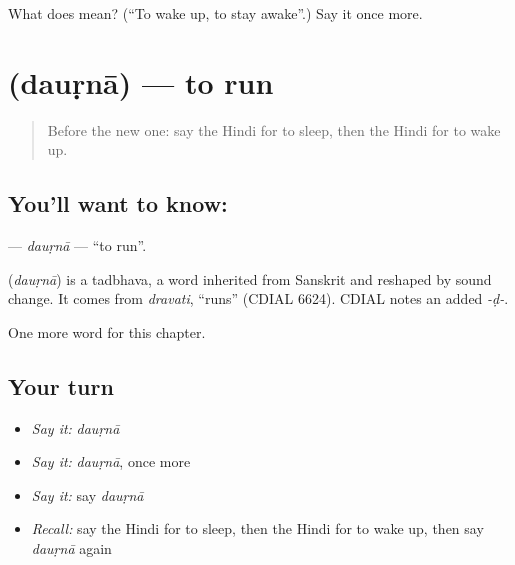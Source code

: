 \begin{tcolorbox}[breakable,colback=teal!4,colframe=teal!35!black,title={Before you move on}]
What does  mean? (\textquotedblleft{}To wake up, to stay awake\textquotedblright{}.) Say it once more.
\end{tcolorbox}
\section[\texorpdfstring{\hi{दौड़ना} (dauṛnā)}{दौड़ना (dauṛnā)}]{ (dauṛnā) — to run}

\label{lesson:HI-C159-daurna}



\begin{quote}
Before the new one: say the Hindi for to sleep, then the Hindi for to wake up.
\end{quote}

\subsection*{You'll want to know: }
\textbf{} — \emph{dauṛnā} — \textquotedblleft{}to run\textquotedblright{}.

\begin{cousinweb}
\textbf{} (\emph{dauṛnā}) is a tadbhava, a word inherited from Sanskrit and reshaped by sound change. It comes from \emph{dravati}, \textquotedblleft{}runs\textquotedblright{} (CDIAL 6624). CDIAL notes an added \emph{-ḍ-}.
\end{cousinweb}

\begin{grammarlens}[title={What you've built}]
One more word for this chapter.
\end{grammarlens}

\subsection*{Your turn}
\begin{itemize}
\raggedright
  \item \emph{Say it:} \emph{dauṛnā}
  \item \emph{Say it:} \emph{dauṛnā}, once more
  \item \emph{Say it:} say \emph{dauṛnā}
  \item \emph{Recall:} say the Hindi for to sleep, then the Hindi for to wake up, then say \emph{dauṛnā} again
\end{itemize}

